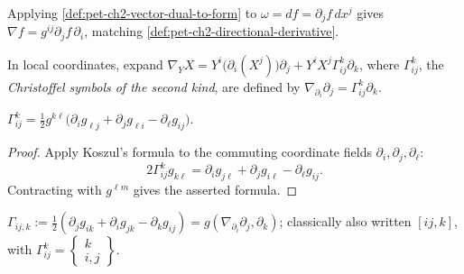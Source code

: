 \begin{remark}
  \label{rem:pet-ch2-gradient-coordinate-formula}
  \leanok
  Applying \cref{def:pet-ch2-vector-dual-to-form} to $\omega=df=\partial_jf\,dx^j$
  gives $\nabla f=g^{ij}\partial_jf\,\partial_i$, matching
  \cref{def:pet-ch2-directional-derivative}.
\end{remark}

\begin{definition}
  \label{def:pet-ch2-christoffel-symbols-second-kind}
  \leanok
  In local coordinates, expand
  $\nabla_YX=Y^i\big(\partial_i(X^j)\big)\partial_j+Y^iX^j\Gamma^k_{ij}\partial_k$, where
  $\Gamma^k_{ij}$, the \emph{Christoffel symbols of the second kind}, are
  defined by $\nabla_{\partial_i}\partial_j=\Gamma^k_{ij}\partial_k$.
\end{definition}

\begin{proposition}
  \label{prop:pet-ch2-christoffel-formula}
  \leanok
  $\displaystyle\Gamma^k_{ij}=\tfrac12g^{k\ell}\big(\partial_ig_{\ell j}+\partial_jg_{\ell i}-\partial_\ell g_{ij}\big)$.
\end{proposition}
\begin{proof}
  \leanok
  \sketch
  Apply Koszul's formula to the
  commuting coordinate fields $\partial_i,\partial_j,\partial_\ell$:
  \[
    2\Gamma^k_{ij}g_{k\ell}
      =\partial_i g_{j\ell}+\partial_j g_{i\ell}
       -\partial_\ell g_{ij}.
  \]
  Contracting with $g^{\ell m}$ gives the asserted formula.
\end{proof}

\begin{definition}
  \label{def:pet-ch2-christoffel-symbols-first-kind}
  \leanok
  $\Gamma_{ij,k}:=\tfrac12(\partial_jg_{ik}+\partial_ig_{jk}-\partial_kg_{ij})=g(\nabla_{\partial_i}\partial_j,\partial_k)$;
  classically also written $[ij,k]$, with $\Gamma^k_{ij}=\begin{Bmatrix}k\\i,j\end{Bmatrix}$.
\end{definition}

